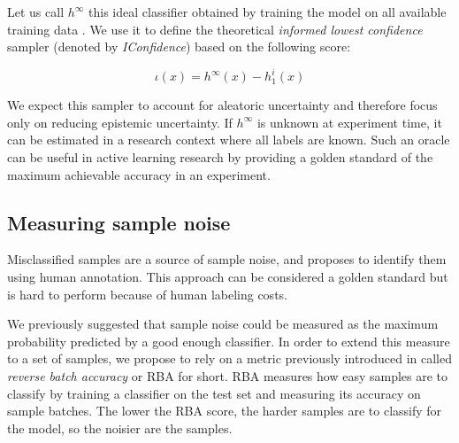 \documentclass[runningheads]{llncs}
\newcommand{\B}[1]{\mathbf{#1}}
\newcommand{\C}[1]{\mathcal{#1}}
\begin{document}
Let us call $h^{\infty}$ this ideal classifier obtained by training the model on all available training data . We use it to define the theoretical \textit{informed lowest confidence} sampler (denoted by \textit{IConfidence}) based on the following score:

$$\iota(x) = h^{\infty}(x) - h^i_{1}(x)$$

We expect this sampler to account for aleatoric uncertainty and therefore focus only on reducing epistemic uncertainty. If $h^{\infty}$ is unknown at experiment time, it can be estimated in a research context where all labels are known. Such an oracle can be useful in active learning research by providing a golden standard of the maximum achievable accuracy in an experiment.


\subsection{Measuring sample noise}

Misclassified samples are a source of sample noise, and \cite{northcutt2021pervasive} proposes to identify them using human annotation. This approach can be considered a golden standard but is hard
to perform because of human labeling costs.

We previously suggested that sample noise could be measured as the maximum probability predicted by a good enough classifier.
In order to extend this measure to a set of samples, we propose to rely on a metric previously introduced in \cite{abraham2020rebuilding}
called \textit{reverse batch accuracy} or RBA for short. RBA measures how easy samples are to classify by training a classifier on the test
set and measuring its accuracy on sample batches. The lower the RBA score, the harder
samples are to classify for the model, so the noisier are the samples.





\end{document}
